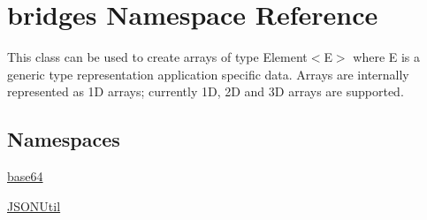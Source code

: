 \hypertarget{namespacebridges}{}\section{bridges Namespace Reference}
\label{namespacebridges}


This class can be used to create arrays of type Element$<$\+E$>$ where E is a generic type representation application specific data. Arrays are internally represented as 1\+D arrays; currently 1\+D, 2\+D and 3\+D arrays are supported.  


\subsection*{Namespaces}
\begin{DoxyCompactItemize}
\item 
 \hyperlink{namespacebridges_1_1base64}{base64}
\item 
 \hyperlink{namespacebridges_1_1_j_s_o_n_util}{J\+S\+O\+N\+Util}
\end{DoxyCompactItemize}
